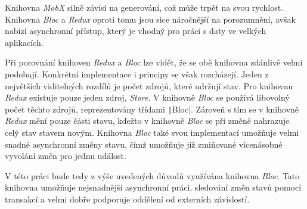 Knihovna \emph{MobX} silně závisí na generování,
což může trpět na svou rychlost.
Knihovna \emph{Bloc} a \emph{Redux} oproti tomu jsou sice náročnější na
porozumnění,
avšak nabízí asynchronní přístup,
který je vhodný pro práci s daty ve velkých aplikacích.

Při porovnání knihoven \emph{Redux} a \emph{Bloc} lze vidět,
že se obě knihovna zdánlivě velmi podobají.
Konkrétní implementace i principy se však rozcházejí.
Jeden z největších viditelných rozdílů je počet zdrojů,
které udržují stav.
Pro knihovnu \emph{Redux} existuje pouze jeden zdroj, \emph{Store}.
V knihovně \emph{Bloc} se používá libovolný počet těchto zdrojů,
reprezentovány třídami \texttt|Bloc|.
Zároveň s tím se v knihovně \emph{Redux} mění pouze části stavu,
kdežto v knihovně \emph{Bloc} se při změně nahrazuje celý stav stavem novým.
Knihovna \emph{Bloc} také svou implementací umožňuje velmi snadné asynchronní změny
stavu,
čímž umožňuje již zmiňované vícenásobné vyvolání změn pro jednu událost.

V této práci bude tedy z výše uvedených důvodů využívána knihovna \emph{Bloc}.
Tato knihovna umožňuje nejsnadnější asynchronní práci,
sledování změn stavů pomocí transakcí
a velmi dobře podporuje oddělení od externích závislostí.
